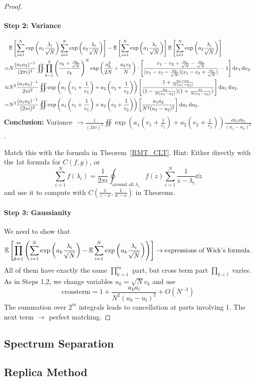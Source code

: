 \begin{proof}
\paragraph{Step 2: Variance}
\begin{align*}
    &\mathbb{E}\left[ \sum_{i=1}^N \exp\left(a_1\frac{\lambda_i}{\sqrt{N}}\right)  \sum_{i=1}^N \exp\left(a_2\frac{\lambda_i}{\sqrt{N}}\right)\right] - \mathbb{E}\left[ \sum_{i=1}^N \exp\left(a_1\frac{\lambda_i}{\sqrt{N}}\right)\right] \mathbb{E}\left[ \sum_{i=1}^N \exp\left(a_2\frac{\lambda_i}{\sqrt{N}}\right)\right]\\
    =& N\frac{(a_1a_2)^{-1}}{(2\pi i)^2} \oiint \prod_{k=1}^2 \left( \frac{v_k + \frac{a_k}{\sqrt{N}}}{v_k}\right)^N \exp\left(\frac{a_k^2}{2N} + \frac{a_kv_k}{N}\right)\cdot \left[ \frac{v_1-v_2+\frac{a_1}{\sqrt{N}}-\frac{a_2}{\sqrt{N}}}{(v_1-v_2-\frac{a_2}{\sqrt{N}})(v_1-v_2+\frac{a_1}{\sqrt{N}})} - 1\right]\mathop{}\!\mathrm{d} v_1 \mathop{}\!\mathrm{d} v_2.
    \\
    \approx&N^2\frac{(a_1a_2)^{-1}}{2\pi i^2}\oiint\exp\left(a_1\left(v_1+\frac{1}{v_1}\right)+a_2\left(v_2+\frac{1}{v_2}\right)\right)
    \left[\frac{1+\frac{a_1-a_2}{N(u_1-u_2)}}{(1-\frac{a_2}{N(u_1-u_2)})(1+\frac{a_1}{N(u_1-u_2)})}\right]\mathop{}\!\mathrm{d} u_1\mathop{}\!\mathrm{d} u_2.
    \\
    =& N^2 \frac{(a_1a_2)^{-1}}{(2\pi i)^2} \oiint \exp\left(a_1\left(v_1+\frac{1}{v_1}\right)+a_2\left(v_2+\frac{1}{v_2}\right)\right)
    \left[\frac{a_1 a_2}{N^2(u_1-u_2)^2}\right]\mathop{}\!\mathrm{d} u_1\mathop{}\!\mathrm{d} u_2.
\end{align*}
\textbf{Conclusion:} Variance $\to \frac{1}{(2\pi i)^2} \oiint \exp\left(a_1\left(v_1+\frac{1}{v_1}\right)+a_2\left(v_2+\frac{1}{v_2}\right)\right) \frac{\dd u_1\dd u_2}{(u_1-u_2)^2}$.

Match this with the formula in Theorem~\ref{RMT_CLT}. Hint: Either directly with the 1st formula for $C(f,g)$, or
\[
\sum_{i=1}^Nf(\lambda_i)=\frac{1}{2\pi i}\oint_{\text{around all }\lambda_i}f(z)\sum_{i=1}^N\frac{1}{z-\lambda_i}\dd z
\]
and use it to compute with $C(\frac{1}{z-x},\frac{1}{w-x})$ in Theorems.

\paragraph{Step 3: Gaussianity} We need to show that 
\[
\mathbb{E}\left[\prod_{k=1}^m
\left(\sum_{i=1}^N\exp\left(a_k\frac{\lambda_i}{\sqrt{N}}\right)-\mathbb{E}\sum_{i=1}^N\exp\left(a_k\frac{\lambda_i}{\sqrt{N}}\right)\right)\right] \to \text{expressions of Wick's formula}.
\]
All of them have exactly the same $\prod_{k=1}^m$ part, but cross term part $\prod_{k<l}$ varies.
As in Steps 1,2, we change variables $u_k=\sqrt{N}v_k$ and use
\[
\text{crossterm}=1+\frac{a_ka_l}{N^2(u_k-u_l)^2}+O\left(N^{-3}\right)
\]
The summation over $2^m$ integrals leads to cancellation at parts involving 1.
The next term $\to$ perfect matching.
\end{proof}

\subsection{Spectrum Separation}
\todo

\subsection{Replica Method}
\todo
